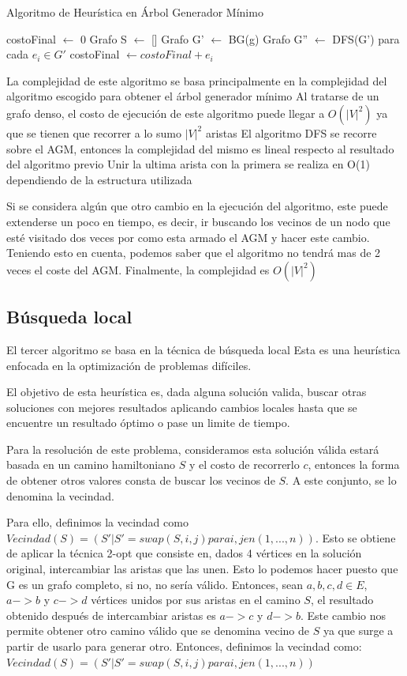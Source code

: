 \documentclass[10pt,a4paper]{article}
\begin{document}
\begin{algorithm}[H]
\caption{Algoritmo de Heurística en Árbol Generador Mínimo}
\begin{algorithmic}[1]
\State costoFinal $\gets$ 0
    \State Grafo S $\gets$ []
    \State Grafo G' $\gets$ BG(g)
    \State Grafo G'' $\gets$ DFS(G')
    \State para cada $e_i \in G'$
        \State costoFinal $\gets costoFinal + e_i$
\EndFunction
\end{algorithmic}
\label{alg:AGM}
\end{algorithm}

La complejidad de este algoritmo se basa principalmente en la complejidad del algoritmo escogido para obtener el árbol generador mínimo
Al tratarse de un grafo denso, el costo de ejecución de este algoritmo puede llegar a $O(|V|^2)$ ya que se tienen que recorrer a lo sumo $|V|^2$ aristas
El algoritmo DFS se recorre sobre el AGM, entonces la complejidad del mismo es lineal respecto al resultado del algoritmo previo
Unir la ultima arista con la primera se realiza en O(1) dependiendo de la estructura utilizada

Si se considera algún que otro cambio en la ejecución del algoritmo, este puede extenderse un poco en tiempo, es decir, ir buscando los vecinos de un nodo que esté visitado dos veces por como esta armado el AGM y hacer este cambio. Teniendo esto en cuenta, podemos saber que el algoritmo no tendrá mas de 2 veces el coste del AGM. Finalmente, la complejidad es $O(|V|^2)$

\subsection{Búsqueda local}
El tercer algoritmo se basa en la técnica de búsqueda local Esta es una heurística enfocada en la optimización de problemas difíciles. 

El objetivo de esta heurística es, dada alguna solución valida, buscar otras soluciones con mejores resultados aplicando cambios locales hasta que se encuentre un resultado óptimo o pase un limite de tiempo.

Para la resolución de este problema, consideramos esta solución válida estará basada en un camino hamiltoniano $S$ y el costo de recorrerlo $c$, entonces la forma de obtener otros valores consta de buscar los vecinos de $S$. A este conjunto, se lo denomina la vecindad.

Para ello, definimos la vecindad como $Vecindad(S) = (S' | S' = swap(S, i, j) para i, j en (1,...,n))$. Esto se obtiene de aplicar la técnica  2-opt que consiste en, dados 4 vértices en la solución original, intercambiar las aristas que las unen. Esto lo podemos hacer puesto que G es un grafo completo, si no, no sería válido. Entonces, sean $a, b, c, d \in E$, $a->b$ y $c->d$ vértices unidos por sus aristas en el camino $S$, el resultado obtenido después de intercambiar aristas es $a->c$ y $d->b$. Este cambio nos permite obtener otro camino válido que se denomina vecino de $S$ ya que surge a partir de usarlo para generar otro. Entonces, definimos la vecindad como: $Vecindad(S) = (S' | S' = swap(S, i, j) para i, j en (1,...,n))$
\end{document}
